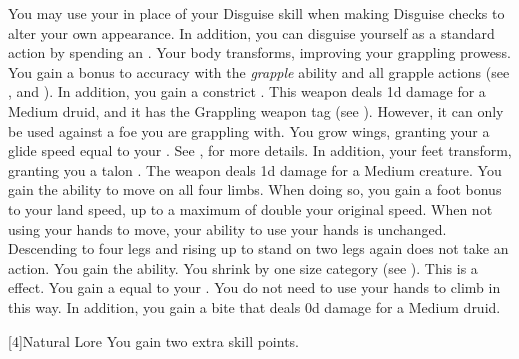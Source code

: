         {
            You may use your  in place of your Disguise skill when making Disguise checks to alter your own appearance.
            In addition, you can disguise yourself as a standard action by spending an . 
            Your body transforms, improving your grappling prowess.
            You gain a  bonus to accuracy with the \textit{grapple} ability and all grapple actions (see , and ).
            In addition, you gain a constrict .
            This weapon deals \plus1d damage for a Medium druid, and it has the Grappling weapon tag (see ).
            However, it can only be used against a foe you are grappling with.
            You grow wings, granting your a glide speed equal to your .
            See , for more details.
            In addition, your feet transform, granting you a talon .
            The weapon deals \minus1d damage for a Medium creature.
            You gain the ability to move on all four limbs.
            When doing so, you gain a  foot bonus to your land speed, up to a maximum of double your original speed.
            When not using your hands to move, your ability to use your hands is unchanged.
            Descending to four legs and rising up to stand on two legs again does not take an action.
            You gain the  ability.
            You shrink by one size category (see ).
            This is a  effect.
            You gain a  equal to your .
            You do not need to use your hands to climb in this way.
            In addition, you gain a bite  that deals \plus0d damage for a Medium druid.
        }

        [4]{Natural Lore}
        You gain two extra skill points.

